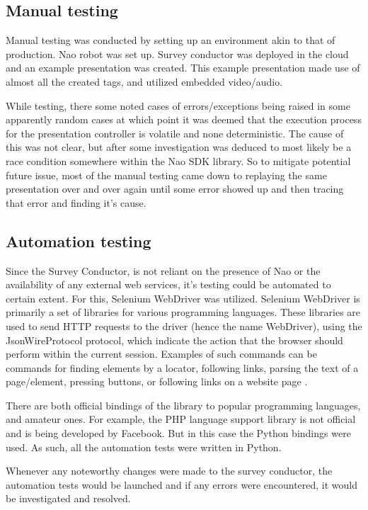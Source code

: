 \documentclass[12pt, fleqn, a4paper]{article}
\begin{document}
\subsection{Manual testing}
Manual testing was conducted by setting up an environment akin to that of production. Nao robot was set up. Survey conductor was deployed in the cloud and an example presentation was created. This example presentation made use of almost all the created tags, and utilized embedded video/audio.\par
While testing, there some noted cases of errors/exceptions being raised in some apparently random cases at which point it was deemed that the execution process for the presentation controller is volatile and none deterministic. The cause of this was not clear, but after some investigation was deduced to most likely be a race condition somewhere within the Nao SDK library. So to mitigate potential future issue, most of the manual testing came down to replaying the same presentation over and over again until some error showed up and then tracing that error and finding it's cause.\par
\subsection{Automation testing}
Since the Survey Conductor, is not reliant on the presence of Nao or the availability of any external web services, it's testing could be automated to certain extent. For this, Selenium WebDriver was utilized.
Selenium WebDriver is primarily a set of libraries for various programming languages. These libraries are used to send HTTP requests to the driver (hence the name WebDriver), using the JsonWireProtocol protocol, which indicate the action that the browser should perform within the current session. Examples of such commands can be commands for finding elements by a locator, following links, parsing the text of a page/element, pressing buttons, or following links on a website page \citep{selenium, selenium2}.\par
There are both official bindings of the library to popular programming languages, and amateur ones. For example, the PHP language support library is not official and is being developed by Facebook. But in this case the Python bindings were used. As such, all the automation tests were written in Python.\par
Whenever any noteworthy changes were made to the survey conductor, the automation tests would be launched and if any errors were encountered, it would be investigated and resolved.
\end{document}
